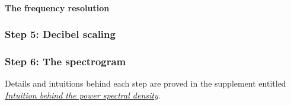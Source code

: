 \documentclass[11pt]{article}
\begin{document}
    \paragraph{The frequency resolution}\label{the-frequency-resolution}

    \subsubsection{Step 5: Decibel scaling}\label{step-5-decibel-scaling}

    \subsubsection{Step 6: The spectrogram}\label{step-6-the-spectrogram}

    Details and intuitions behind each step are proved in the supplement
entitled
\href{Supplement.\%20Intuition\%20behind\%20the\%20power\%20spectral\%20density.ipynb}{\emph{Intuition
behind the power spectral density}}.


    
    
    
    
\end{document}
